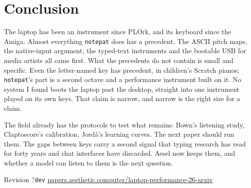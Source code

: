 \documentclass[10pt,letterpaper,twocolumn]{article}
\newcommand{\np}{\texttt{notepat}}
\providecommand{\paperhash}{dev}\providecommand{\paperrev}{?}}
\begin{document}
\section{Conclusion}

The laptop has been an instrument since PLOrk, and its keyboard since the Amiga. Almost everything \np{} does has a precedent. The ASCII pitch maps, the native-input argument, the typed-text instruments and the bootable USB for media artists all came first. What the precedents do not contain is small and specific. Even the letter-named key has precedent, in children's Scratch pianos; \np{}'s part is a second octave and a performance instrument built on it. No system I found boots the laptop past the desktop, straight into one instrument played on its own keys. That claim is narrow, and narrow is the right size for a claim.

The field already has the protocols to test what remains: Bown's listening study, Claptoscore's calibration, Jordà's learning curves. The next paper should run them. The gaps between keys carry a second signal that typing research has read for forty years and chat interfaces have discarded. Aesel now keeps them, and whether a model can listen to them is the next question.


\balance
\setlength{\bibsep}{0pt}
{\footnotesize}

\vspace{0.8em}
\begin{center}
\footnotesize\sffamily\color{acgray}
Revision \paperrev\;\textperiodcentered\;\texttt{\paperhash}\;\textperiodcentered\;
\href{https://papers.aesthetic.computer/laptop-performance-26-arxiv.pdf}{papers.aesthetic.computer/laptop-performance-26-arxiv}
\end{center}
\end{document}

